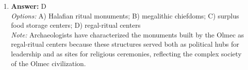 \documentclass[12pt]{article}
\begin{document}
\begin{enumerate}[label=\arabic*.]
\\ \textit{Note:} The correct answer is "greater regional differentiation" because during the North American Archaic period, diverse environmental conditions and resources led to distinct subsistence strategies that varied significantly across different regions, reflecting adaptations to local ecological contexts.
\item \textbf{Answer:} D
\\ \textit{Options:} A) Halafian ritual monuments; B) megalithic chiefdoms; C) surplus food storage centers; D) regal-ritual centers
\\ \textit{Note:} Archaeologists have characterized the monuments built by the Olmec as regal-ritual centers because these structures served both as political hubs for leadership and as sites for religious ceremonies, reflecting the complex society of the Olmec civilization.
\end{enumerate}
\end{document}
